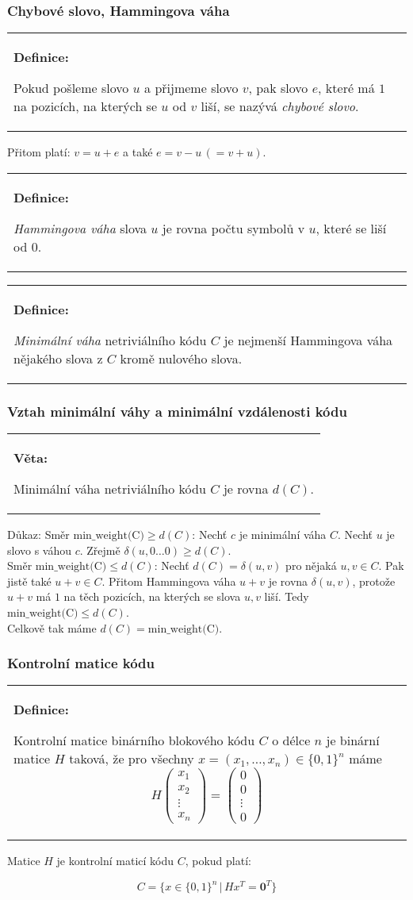 \documentclass{beamer}
\newenvironment{definice}
{
    \begin{center}
    \begin{tabular}{p{9cm}}
    \textbf{Definice:}
}
{
    \end{tabular}
    \end{center}
}
\newenvironment{veta}
{
    \begin{center}
    \begin{tabular}{p{9cm}}
    \textbf{Věta:}
}
{
    \end{tabular}
    \end{center}
}
\newcommand{\sep}{\,|\,}
\newcommand{\emptyline}{\\$\,$\\}
\begin{document}
\begin{frame}[t,fragile]\frametitle{Chybové slovo, Hammingova váha} 
    \begin{definice}
        Pokud pošleme slovo $u$ a přijmeme slovo $v$, pak slovo $e$, které má $1$ na pozicích, na kterých se $u$ od $v$ liší, se nazývá \textit{chybové slovo}.
    \end{definice}

    Přitom platí: $v = u + e$ a také $e = v-u\, (= v+u)$.

    \begin{definice}
    \textit{Hammingova váha} slova $u$ je rovna počtu symbolů v $u$, které se liší od $0$.
    \end{definice}

    \begin{definice}
    \textit{Minimální váha} netriviálního kódu $C$ je nejmenší Hammingova váha nějakého slova z $C$ kromě nulového slova.
    \end{definice}
\end{frame}



\begin{frame}[t,fragile]\frametitle{Vztah minimální váhy a minimální vzdálenosti kódu} 
    \begin{veta}
    Minimální váha netriviálního kódu $C$ je rovna $d(C)$.
    \end{veta}

    Důkaz: Směr $\mbox{min\_weight(C)}\ge d(C)$: Nechť $c$ je minimální váha $C$. Nechť $u$ je slovo s váhou $c$. Zřejmě $\delta(u, 0\dots0)\ge d(C)$.
\emptyline
    Směr $\mbox{min\_weight(C)}\le d(C)$: Nechť $d(C)=\delta(u,v)$ pro nějaká $u,v\in C$. Pak jistě také $u+v\in C$. Přitom Hammingova váha $u+v$ je rovna $\delta(u,v)$, protože $u+v$ má $1$ na těch pozicích, na kterých se slova $u,v$ liší. Tedy $\mbox{min\_weight(C)}\le d(C)$.
\emptyline
    Celkově tak máme $d(C) = \mbox{min\_weight(C)}$.
\end{frame}


\begin{frame}[t,fragile]\frametitle{Kontrolní matice kódu} 
    \begin{definice}
        Kontrolní matice binárního blokového kódu $C$ o délce $n$ je binární matice $H$ taková, že pro všechny $x=(x_1,\dots, x_n)\in\{0,1\}^n$ máme
$$
H
\begin{pmatrix}
x_1\\
x_2\\
\vdots\\
x_n
\end{pmatrix}
=
\begin{pmatrix}
0\\
0\\
\vdots\\
0
\end{pmatrix}
$$
    \end{definice}

    Matice $H$ je kontrolní maticí kódu $C$, pokud platí:

$$
C=\{x\in\{0,1\}^n\sep Hx^T=\textbf{0}^T\}
$$
\end{frame}
\end{document}
